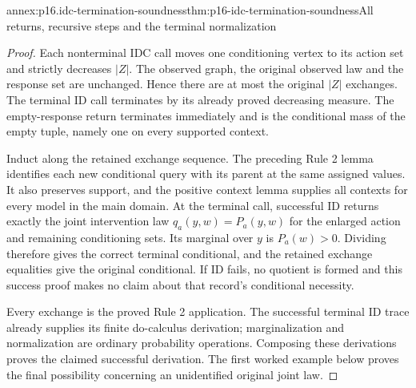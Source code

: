 \begin{annexitem}{annex:p16.idc-termination-soundness}{thm:p16-idc-termination-soundness}{All returns, recursive steps and the terminal normalization}
\begin{proof}
Each nonterminal IDC call moves one conditioning vertex to its
action set and strictly decreases \(|Z|\). The observed graph,
the original observed law and the response set are unchanged.
Hence there are at most the original \(|Z|\) exchanges. The
terminal ID call terminates by its already proved decreasing measure.
The empty-response return terminates immediately and is the conditional
mass of the empty tuple, namely one on every supported context.

Induct along the retained exchange sequence. The preceding Rule 2
lemma identifies each new conditional query with its parent at the
same assigned values. It also preserves support, and the positive
context lemma supplies all contexts for every model in the main
domain. At the terminal call, successful ID returns exactly the
joint intervention law \(q_a(y,w)=P_a(y,w)\) for the enlarged
action and remaining conditioning sets. Its marginal over \(y\)
is \(P_a(w)>0\). Dividing therefore gives the correct terminal
conditional, and the retained exchange equalities give the original
conditional. If ID fails, no quotient is formed and this success
proof makes no claim about that record's conditional necessity.

Every exchange is the proved Rule 2 application. The successful
terminal ID trace already supplies its finite do-calculus derivation;
marginalization and normalization are ordinary probability operations.
Composing these derivations proves the claimed successful derivation.
The first worked example below proves the final possibility concerning
an unidentified original joint law.
\end{proof}
\end{annexitem}

